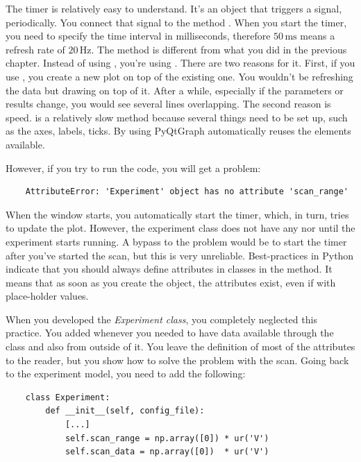 The timer is relatively easy to understand. It's an object that triggers a signal,  periodically. You connect that signal to the method . When you start the timer, you need to specify the time interval in milliseconds, therefore $50\,\textrm{ms}$ means a refresh rate of $20\,\textrm{Hz}$. The  method is different from what you did in the previous chapter. Instead of using , you're using . There are two reasons for it. First, if you use , you create a new plot on top of the existing one. You wouldn't be refreshing the data but drawing on top of it. After a while, especially if the parameters or results change, you would see several lines overlapping. The second reason is speed.  is a relatively slow method because several things need to be set up, such as the axes, labels, ticks. By using  PyQtGraph automatically reuses the elements available.

However, if you try to run the code, you will get a problem:

\begin{verbatim}
    AttributeError: 'Experiment' object has no attribute 'scan_range'
\end{verbatim}


When the window starts, you automatically start the timer, which, in turn, tries to update the plot. However, the experiment class does not have any  nor  until the experiment starts running. A bypass to the problem would be to start the timer after you've started the scan, but this is very unreliable. Best-practices in Python indicate that you should always define attributes in classes in the  method. It means that as soon as you create the object, the attributes exist, even if with place-holder values.

When you developed the \emph{Experiment class}, you completely neglected this practice. You added  whenever you needed to have data available through the class and also from outside of it. You leave the definition of most of the attributes to the reader, but you show how to solve the problem with the scan. Going back to the experiment model, you need to add the following:

\begin{verbatim}
    class Experiment:
        def __init__(self, config_file):
            [...]
            self.scan_range = np.array([0]) * ur('V')
            self.scan_data = np.array([0])  * ur('V')
\end{verbatim}

